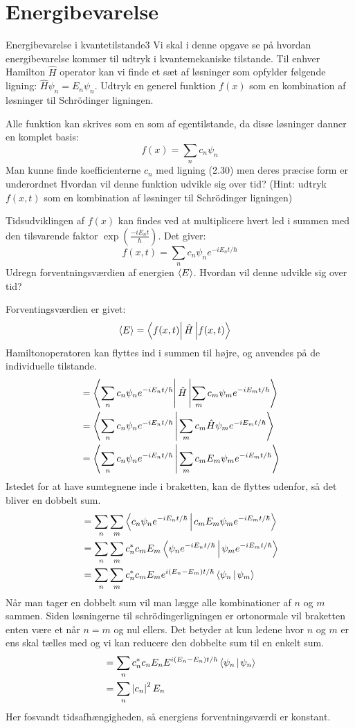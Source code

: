 \section*{Energibevarelse}
\begin{opgave}{Energibevarelse i kvantetilstande}{3}
Vi skal i denne opgave se på hvordan energibevarelse kommer til udtryk i kvantemekaniske tilstande. Til enhver Hamilton $\hat{H}$ operator kan vi finde et sæt af løsninger som opfylder følgende ligning: $\hat{H}\psi_n=E_n\psi_n$.
\opg Udtryk en generel funktion $f(x)$ som en kombination af løsninger til Schrödinger ligningen.

Alle funktion kan skrives som en som af egentilstande, da disse løsninger danner en komplet basis:
$$
f(x) = \sum_nc_n\psi_n
$$
Man kunne finde koefficienterne $c_n$ med ligning (2.30) men deres præcise form er underordnet 
\opg Hvordan vil denne funktion udvikle sig over tid? (Hint: udtryk $f(x,t)$ som en kombination af løsninger til Schrödinger ligningen)

Tidsudviklingen af $f(x)$ kan findes ved at multiplicere hvert led i summen med den tilsvarende faktor $\exp\left(\frac{-iE_nt}{\hbar}\right)$. Det giver:
$$
f(x,t) = \sum_n c_n\psi_ne^{-iE_nt/\hbar}
$$
\opg Udregn forventningsværdien af energien $\left< E \right>$. Hvordan vil denne udvikle sig over tid?

Forventingsværdien er givet:
\begin{align*}
\expect E &= \matrixel{f(x,t)}{\op H}{f(x,t)}
\end{align*}
Hamiltonoperatoren kan flyttes ind i summen til højre, og anvendes på de individuelle tilstande.
\begin{align*}
&= \matrixel{\sum_n c_n\psi_ne^{-iE_nt/\hbar}}{\op H}{\sum_m c_m\psi_me^{-iE_mt/\hbar}}\\
&= \braket{\sum_n c_n\psi_ne^{-iE_nt/\hbar}}{\sum_m c_m\op H\psi_me^{-iE_mt/\hbar}}\\
&= \braket{\sum_n c_n\psi_ne^{-iE_nt/\hbar}}{\sum_m c_mE_m\psi_me^{-iE_mt/\hbar}}
\end{align*}
Istedet for at have sumtegnene inde i braketten, kan de flyttes udenfor, så det bliver en dobbelt sum.
\begin{align*}
&=\sum_n\sum_m\braket{c_n\psi_ne^{-iE_nt/\hbar}}{c_mE_m\psi_me^{-iE_mt/\hbar}}\\
&=\sum_n\sum_mc_n^*c_mE_m\braket{\psi_ne^{-iE_nt/\hbar}}{\psi_me^{-iE_mt/\hbar}}\\
&=\sum_n\sum_mc_n^*c_mE_me^{i(E_n-E_m)t/\hbar}\braket{\psi_n}{\psi_m}
\end{align*}
Når man tager en dobbelt sum vil man lægge alle kombinationer af $n$ og $m$ sammen. Siden løsningerne til schrödingerligningen er ortonormale vil braketten enten være et når $n=m$ og nul ellers. Det betyder at kun ledene hvor $n$ og $m$ er ens skal tælles med og vi kan reducere den dobbelte sum til en enkelt sum.
\begin{align*}
&= \sum_nc_n^*c_nE_nE^{i(E_n-E_n)t/\hbar}\braket{\psi_n}{\psi_n}\\
&= \sum_n \abs{c_n}^2E_n
\end{align*}
Her fosvandt tidsafhængigheden, så energiens forventningsværdi er konstant.
\end{opgave}